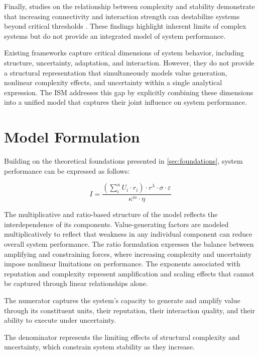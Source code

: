 \documentclass[11pt,a4paper]{article}
\theoremstyle{definition}
\begin{document}
Finally, studies on the relationship between complexity and stability demonstrate that increasing connectivity and interaction strength can destabilize systems beyond critical thresholds \parencite{may1972}.
These findings highlight inherent limits of complex systems but do not provide an integrated model of system performance.

Existing frameworks capture critical dimensions of system behavior, including structure, uncertainty, adaptation, and interaction.
However, they do not provide a structural representation that simultaneously models value generation, nonlinear complexity effects, and uncertainty within a single analytical expression.
The \ac{ISM} addresses this gap by explicitly combining these dimensions into a unified model that captures their joint influence on system performance.


\section{Model Formulation}
\label{sec:model}

Building on the theoretical foundations presented in \cref{sec:foundations}, system performance can be expressed as follows:

\begin{equation}
\label{eq:ism}
I = \frac{\left(\sum_{i}^{n} U_i \cdot r_i\right)\cdot r^{\lambda}\cdot \sigma \cdot \varepsilon}{\kappa^m \cdot \eta}
\end{equation}

The multiplicative and ratio-based structure of the model reflects the interdependence of its components.
Value-generating factors are modeled multiplicatively to reflect that weakness in any individual component can reduce overall system performance.
The ratio formulation expresses the balance between amplifying and constraining forces, where increasing complexity and uncertainty impose nonlinear limitations on performance.
The exponents associated with reputation and complexity represent amplification and scaling effects that cannot be captured through linear relationships alone.

The numerator captures the system's capacity to generate and amplify value through its constituent units, their reputation, their interaction quality, and their ability to execute under uncertainty.

The denominator represents the limiting effects of structural complexity and uncertainty, which constrain system stability as they increase.
\end{document}
